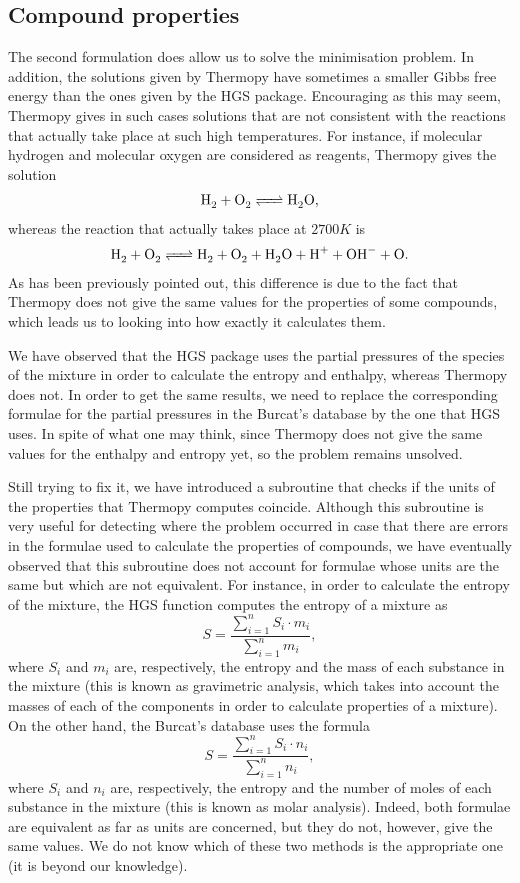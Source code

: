\documentclass[a4paper,10pt]{article}
\theoremstyle{plain}
\theoremstyle{definition}
\theoremstyle{remark}
\begin{document}
\subsection{Compound properties}
The second formulation does allow us to solve the minimisation problem. In addition, the solutions given by Thermopy have sometimes a smaller Gibbs free energy than the ones given by the HGS package. Encouraging as this may seem, Thermopy gives in such cases solutions that are not consistent with the reactions that actually take place at such high temperatures. For instance, if molecular hydrogen and molecular oxygen are considered as reagents, Thermopy gives the solution
\begin{align}
\cee{H2 + O2 <=> H2O},
\end{align}
whereas the reaction that actually takes place at $2700 K$ is
\begin{align}
\cee{H2 + O2 <=> H2 + O2 + H2O + H^+ + OH^- + O}.
\end{align}
As has been previously pointed out, this difference is due to the fact that Thermopy does not give the same values for the properties of some compounds, which leads us to looking into how exactly it calculates them.

We have observed that the HGS package uses the partial pressures of the species of the mixture in order to calculate the entropy and enthalpy, whereas Thermopy does not. In order to get the same results, we need to replace the corresponding formulae for the partial pressures in the Burcat's database by the one that HGS uses. In spite of what one may think, since Thermopy does not give the same values for the enthalpy and entropy yet, so the problem remains unsolved.

Still trying to fix it, we have introduced a subroutine that checks if the units of the properties that Thermopy computes coincide. Although this subroutine is very useful for detecting where the problem occurred in case that there are errors in the formulae used to calculate the properties of compounds, we have eventually observed that this subroutine does not account for formulae whose units are the same but which are not equivalent. For instance, in order to calculate the entropy of the mixture, the HGS function computes the entropy of a mixture as
\begin{equation}
S = \frac{\sum_{i=1}^n S_i\cdot m_i}{\sum_{i=1}^n m_i},
\end{equation}
where $S_i$ and $m_i$ are, respectively, the entropy and the mass of each substance in the mixture (this is known as gravimetric analysis, which takes into account the masses of each of the components in order to calculate properties of a mixture). On the other hand, the Burcat's database uses the formula
\begin{equation}
S = \frac{\sum_{i=1}^n S_i\cdot n_i}{\sum_{i=1}^n n_i},
\end{equation}
where $S_i$ and $n_i$ are, respectively, the entropy and the number of moles of each substance in the mixture (this is known as molar analysis). Indeed, both formulae are equivalent as far as units are concerned, but they do not, however, give the same values. We do not know which of these two methods is the appropriate one (it is beyond our knowledge).
\end{document}
